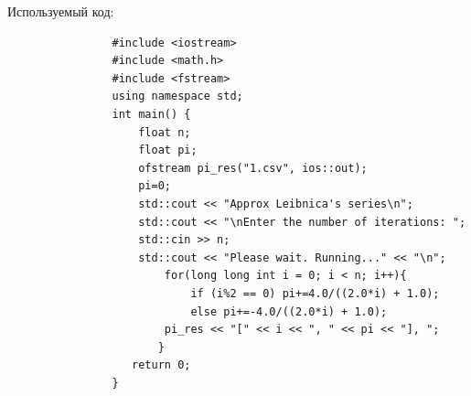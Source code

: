 \documentclass[a4paper, 12pt]{article}
\begin{document}
\begin{enumerate}
\begin{enumerate}
                        Используемый код:
                        \begin{lstlisting}
                #include <iostream>
                #include <math.h>
                #include <fstream>
                using namespace std;                
                int main() {
                    float n;
                    float pi;
                    ofstream pi_res("1.csv", ios::out);
                    pi=0;    
                    std::cout << "Approx Leibnica's series\n";
                    std::cout << "\nEnter the number of iterations: ";
                    std::cin >> n;
                    std::cout << "Please wait. Running..." << "\n";            
                        for(long long int i = 0; i < n; i++){
                            if (i%2 == 0) pi+=4.0/((2.0*i) + 1.0);
                            else pi+=-4.0/((2.0*i) + 1.0);
                        pi_res << "[" << i << ", " << pi << "], ";
                       }
                   return 0;
                }
                        \end{lstlisting}
    

\end{enumerate}
\end{enumerate}
\end{document}
